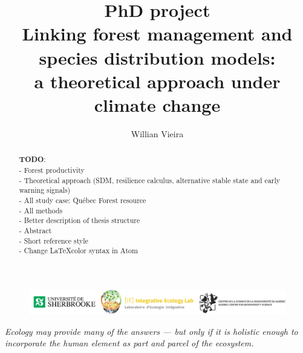 


\title{
  PhD project \\
  \bigskip
  Linking forest management and species distribution models: \\
  a theoretical approach under climate change
}

\author[1,*]{Willian Vieira}
\date{}



\maketitle

\begin{abstract}

\textbf{TODO}: \\
- Forest productivity \\
- Theoretical approach (SDM, resilience calculus, alternative stable state and early warning signals) \\
- All study case: Québec Forest resource \\
- All methods \\
- Better description of thesis structure \\
- Abstract \\
- Short reference style \\
- Change \LaTeX color syntax in Atom

\end{abstract}

\vfill
\begin{figure}
\centering\includegraphics[width=16cm]{img/logo.pdf}
\end{figure}
\thispagestyle{empty} %
\clearpage

\thispagestyle{empty}
\tableofcontents
\clearpage


\begin{displayquote}
\centering\textit{Ecology may provide many of the answers — but only if it is holistic enough to incorporate the human element as part and parcel of the ecosystem.} \\ 
\end{displayquote}

